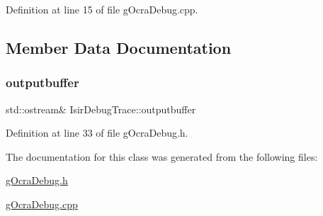 Definition at line 15 of file g\+Ocra\+Debug.\+cpp.



\subsection{Member Data Documentation}
\hypertarget{classIsirDebugTrace_aede1e58ef880d19d0203086232a6dd99}{}\label{classIsirDebugTrace_aede1e58ef880d19d0203086232a6dd99} 
\subsubsection{\texorpdfstring{outputbuffer}{outputbuffer}}
{\footnotesize\ttfamily std\+::ostream\& Isir\+Debug\+Trace\+::outputbuffer}



Definition at line 33 of file g\+Ocra\+Debug.\+h.



The documentation for this class was generated from the following files\+:\begin{DoxyCompactItemize}
\item 
\hyperlink{gOcraDebug_8h}{g\+Ocra\+Debug.\+h}\item 
\hyperlink{gOcraDebug_8cpp}{g\+Ocra\+Debug.\+cpp}\end{DoxyCompactItemize}
